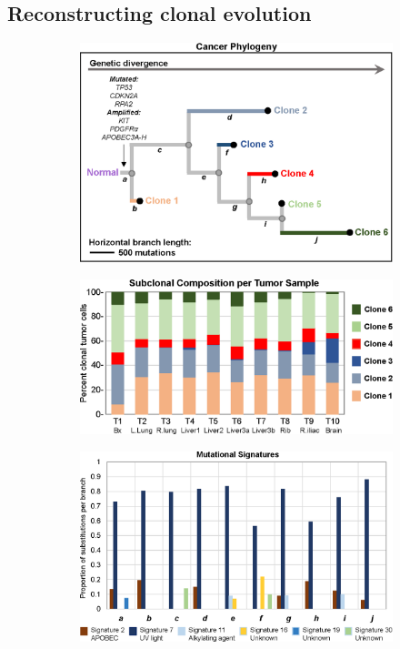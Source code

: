 \subsection{Reconstructing clonal evolution}
\label{ssec:303:clone_results}
\begin{figure}[htbp]
	\centering
	\begin{subfigure}{0.4\textwidth}
		\includegraphics[width=\textwidth,keepaspectratio]{images/303/canopy_tree}
		\caption{}\label{fig:303:canopy_tree}
	\end{subfigure}%
	\hfill%
	\begin{subfigure}{0.55\textwidth}
	    \includegraphics[width=\textwidth,keepaspectratio]{images/303/canopy_P}
	    \caption{}\label{fig:303:canopy_P}
	\end{subfigure}\par\vspace{0.1cm}
	\begin{subfigure}{0.5\textwidth}
	    \includegraphics[width=\textwidth,keepaspectratio]{images/303/sigs_per_branch}

\end{subfigure}
\end{figure}
